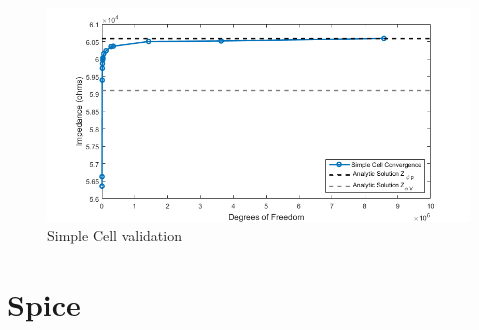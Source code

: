 \begin{figure}
    \centering
    \includegraphics[width=\textwidth]{images/simpleCellValidation.png}
    \caption{Simple Cell validation}
    \label{fig:simple_cell_validation}
\end{figure}


\section{Spice}